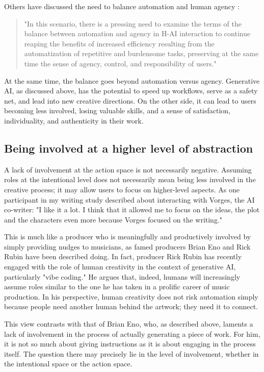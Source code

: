 Others have discussed the need to balance automation and human agency \cite{Moruzzi2024-cq}:
\begin{quote}
    "In this scenario, there is a pressing need to examine the terms of the balance between automation and agency in H-AI interaction to continue reaping the benefits of increased efficiency resulting from the automatization of repetitive and burdensome tasks, preserving at the same time the sense of agency, control, and responsibility of users."
\end{quote}
At the same time, the balance goes beyond automation versus agency. Generative AI, as discussed above, has the potential to speed up workflows, serve as a safety net, and lead into new creative directions. On the other side, it can lead to users becoming less involved, losing valuable skills, and a sense of satisfaction, individuality, and authenticity in their work.


\subsection{Being involved at a higher level of abstraction}

A lack of involvement at the action space is not necessarily negative. Assuming roles at the intentional level does not necessarily mean being less involved in the creative process; it may allow users to focus on higher-level aspects. As one participant in my writing study described about interacting with Vorges, the AI co-writer: "I like it a lot. I think that it allowed me to focus on the ideas, the plot and the characters even more because Vorges focused on the writing."

This is much like a producer who is meaningfully and productively involved by simply providing nudges to musicians, as famed producers Brian Eno and Rick Rubin have been described doing. In fact, producer Rick Rubin has recently engaged with the role of human creativity in the context of generative AI, particularly "vibe coding." He argues that, indeed, humans will increasingly assume roles similar to the one he has taken in a prolific career of music production. In his perspective, human creativity does not risk automation simply because people need another human behind the artwork; they need it to connect.

This view contrasts with that of Brian Eno, who, as described above, laments a lack of involvement in the process of actually generating a piece of work. For him, it is not so much about giving instructions as it is about engaging in the process itself. The question there may precisely lie in the level of involvement, whether in the intentional space or the action space.

